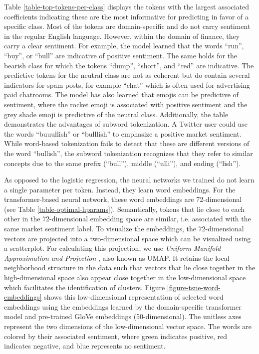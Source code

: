Table \ref{table-top-tokens-per-class} displays the tokens with the largest associated coefficients indicating these are the most informative for predicting in favor of a specific class. Most of the tokens are domain-specific and do not carry sentiment in the regular English language. However, within the domain of finance, they carry a clear sentiment. For example, the model learned that the words ``run'', ``buy'', or ``bull'' are indicative of positive sentiment. The same holds for the bearish class for which the tokens ``dump'', ``short'', and ``red'' are indicative. The predictive tokens for the neutral class are not as coherent but do contain several indicators for spam posts, for example ``chat'' which is often used for advertising paid chatrooms. The model has also learned that emojis can be predictive of sentiment, where the rocket emoji is associated with positive sentiment and the grey shade emoji is predictive of the neutral class. Additionally, the table demonstrates the advantages of subword tokenization. A Twitter user could use the words ``buuullish'' or ``bulllish'' to emphasize a positive market sentiment. While word-based tokenization fails to detect that these are different versions of the word ``bullish'', the subword tokenization recognizes that they refer to similar concepts due to the same prefix (``bull''), middle (``ulli''), and ending (``lish'').



As opposed to the logistic regression, the neural networks we trained do not learn a single parameter per token. Instead, they learn word embeddings. For the transformer-based neural network, these word embeddings are 72-dimensional (see Table \ref{table-optimal-hparams}). Semantically, tokens that lie close to each other in the 72-dimensional embedding space are similar, i.e. associated with the same market sentiment label. To visualize the embeddings, the 72-dimensional vectors are projected into a two-dimensional space which can be visualized using a scatterplot. For calculating this projection, we use \emph{Uniform Manifold Approximation and Projection} , also known as UMAP. It retains the local neighborhood structure in the data such that vectors that lie close together in the high-dimensional space also appear close together in the low-dimensional space which facilitates the identification of clusters. Figure \ref{figure-tsne-word-embeddings} shows this low-dimensional representation of selected word embeddings using the embeddings learned by the domain-specific transformer model and pre-trained GloVe embeddings (50-dimensional). The unitless axes represent the two dimensions of the low-dimensional vector space. The words are colored by their associated sentiment, where green indicates positive, red indicates negative, and blue represents no sentiment.

